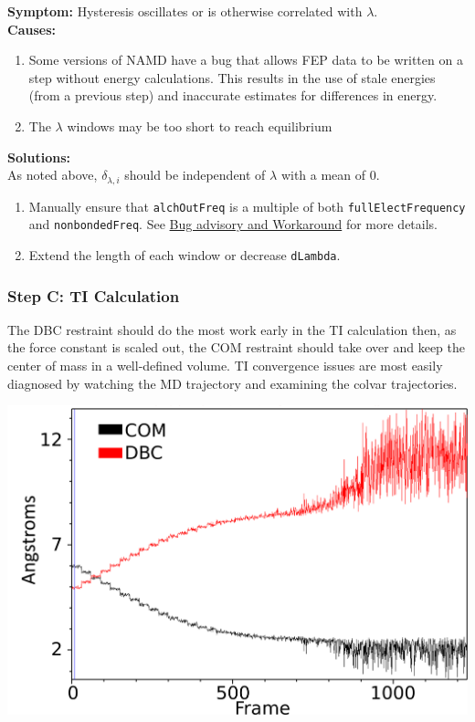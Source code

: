 \documentclass[9pt,tutorial]{Styling/livecoms}
\newcommand{\textInput}[1]{\texttt{#1}}
\begin{document}
\noindent\textbf{Symptom:}  Hysteresis oscillates or is otherwise correlated with $\lambda$.\\
\textbf{Causes:}
\begin{enumerate}
    \item Some versions of NAMD have a bug that allows FEP data to be written on a step without energy calculations. This results in the use of stale energies (from a previous step) and inaccurate estimates for differences in energy.
    \item The $\lambda$ windows may be too short to reach equilibrium
\end{enumerate}

\noindent\textbf{Solutions:}\\
As noted above, $\delta_{\lambda,i}$ should be independent of $\lambda$ with a mean of 0.
\begin{enumerate}
    \item Manually ensure that \textInput{alchOutFreq} is a multiple of both \textInput{fullElectFrequency} and \textInput{nonbondedFreq}. See \href{https://www.ks.uiuc.edu/Research/namd/mailing_list/namd-l.2020-2021/1487.html}{Bug advisory and Workaround} for more details.
    \item Extend the length of each window or decrease \textInput{dLambda}.
\end{enumerate}

\subsubsection{Step C: TI Calculation}
The DBC restraint should do the most work early in the TI calculation then, as the force constant is scaled out, the COM restraint should take over and keep the center of mass in a well-defined volume. TI convergence issues are most easily diagnosed by watching the MD trajectory and examining the colvar trajectories.

\includegraphics[width=0.9\linewidth]{CV_COM_mismatchedRefs.png}
\end{document}

